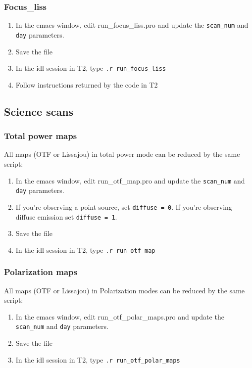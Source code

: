\documentclass[a4paper,10pt]{article}
\begin{document}
\subsubsection{Focus\_liss}

\begin{enumerate}
\item In the emacs window, edit run\_focus\_liss.pro and update the {\tt scan\_num}
  and {\tt day} parameters.
\item Save the file
\item In the idl session in T2, type {\tt .r run\_focus\_liss}
\item Follow instructions returned by the code in T2
\end{enumerate}

\subsection{Science scans}

\subsubsection{Total power maps}

All maps (OTF or Lissajou) in total power mode can be reduced by the same script:

\begin{enumerate}
\item In the emacs window, edit run\_otf\_map.pro and update the {\tt scan\_num}
  and {\tt day} parameters.
\item If you're observing a point source, set {\tt diffuse = 0}. If you're
  observing diffuse emission set {\tt diffuse = 1}.
\item Save the file
\item In the idl session in T2, type {\tt .r run\_otf\_map}
\end{enumerate}

\subsubsection{Polarization maps}

All maps (OTF or Lissajou) in Polarization modes can be reduced by the same script:
\begin{enumerate}
\item In the emacs window, edit run\_otf\_polar\_maps.pro and update the {\tt scan\_num}
  and {\tt day} parameters.
\item Save the file
\item In the idl session in T2, type {\tt .r run\_otf\_polar\_maps}
\end{enumerate}


\end{document}
